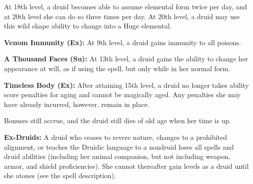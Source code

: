 At 18th level, a druid becomes able to assume elemental form twice per day, and at 20th level she can do so three times per day. At 20th level, a druid may use this wild shape ability to change into a Huge elemental.

\textbf{Venom Immunity (Ex):} At 9th level, a druid gains immunity to all poisons. 

\textbf{A Thousand Faces (Su):} At 13th level, a druid gains the ability to change her appearance at will, as if using the  spell, but only while in her normal form.

\textbf{Timeless Body (Ex):} After attaining 15th level, a druid no longer takes ability score penalties for aging and cannot be magically aged. Any penalties she may have already incurred, however, remain in place.

Bonuses still accrue, and the druid still dies of old age when her time is up.

\textbf{Ex-Druids:} A druid who ceases to revere nature, changes to a prohibited alignment, or teaches the Druidic language to a nondruid loses all spells and druid abilities (including her animal companion, but not including weapon, armor, and shield proficiencies). She cannot thereafter gain levels as a druid until she atones (see the  spell description).
